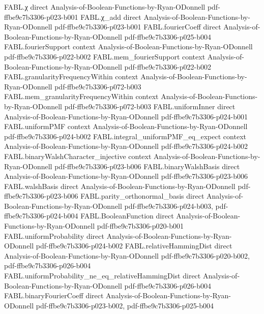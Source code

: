\begin{theorem}
\proofstep
  {FABL.χ}
  {direct}
  {Analysis-of-Boolean-Functions-by-Ryan-ODonnell}
  {pdf-ffbe9c7b3306-p023-b001}
\proofstep
  {FABL.χ_add}
  {direct}
  {Analysis-of-Boolean-Functions-by-Ryan-ODonnell}
  {pdf-ffbe9c7b3306-p023-b001}
\proofstep
  {FABL.fourierCoeff}
  {direct}
  {Analysis-of-Boolean-Functions-by-Ryan-ODonnell}
  {pdf-ffbe9c7b3306-p025-b004}
\proofstep
  {FABL.fourierSupport}
  {context}
  {Analysis-of-Boolean-Functions-by-Ryan-ODonnell}
  {pdf-ffbe9c7b3306-p022-b002}
\proofstep
  {FABL.mem_fourierSupport}
  {context}
  {Analysis-of-Boolean-Functions-by-Ryan-ODonnell}
  {pdf-ffbe9c7b3306-p022-b002}
\proofstep
  {FABL.granularityFrequencyWithin}
  {context}
  {Analysis-of-Boolean-Functions-by-Ryan-ODonnell}
  {pdf-ffbe9c7b3306-p072-b003}
\proofstep
  {FABL.mem_granularityFrequencyWithin}
  {context}
  {Analysis-of-Boolean-Functions-by-Ryan-ODonnell}
  {pdf-ffbe9c7b3306-p072-b003}
\proofstep
  {FABL.uniformInner}
  {direct}
  {Analysis-of-Boolean-Functions-by-Ryan-ODonnell}
  {pdf-ffbe9c7b3306-p024-b001}
\proofstep
  {FABL.uniformPMF}
  {context}
  {Analysis-of-Boolean-Functions-by-Ryan-ODonnell}
  {pdf-ffbe9c7b3306-p024-b002}
\proofstep
  {FABL.integral_uniformPMF_eq_expect}
  {context}
  {Analysis-of-Boolean-Functions-by-Ryan-ODonnell}
  {pdf-ffbe9c7b3306-p024-b002}
\proofstep
  {FABL.binaryWalshCharacter_injective}
  {context}
  {Analysis-of-Boolean-Functions-by-Ryan-ODonnell}
  {pdf-ffbe9c7b3306-p023-b006}
\proofstep
  {FABL.binaryWalshBasis}
  {direct}
  {Analysis-of-Boolean-Functions-by-Ryan-ODonnell}
  {pdf-ffbe9c7b3306-p023-b006}
\proofstep
  {FABL.walshBasis}
  {direct}
  {Analysis-of-Boolean-Functions-by-Ryan-ODonnell}
  {pdf-ffbe9c7b3306-p023-b006}
\proofstep
  {FABL.parity_orthonormal_basis}
  {direct}
  {Analysis-of-Boolean-Functions-by-Ryan-ODonnell}
  {pdf-ffbe9c7b3306-p024-b003,
    pdf-ffbe9c7b3306-p024-b004}
\proofstep
  {FABL.BooleanFunction}
  {direct}
  {Analysis-of-Boolean-Functions-by-Ryan-ODonnell}
  {pdf-ffbe9c7b3306-p020-b001}
\proofstep
  {FABL.uniformProbability}
  {direct}
  {Analysis-of-Boolean-Functions-by-Ryan-ODonnell}
  {pdf-ffbe9c7b3306-p024-b002}
\proofstep
  {FABL.relativeHammingDist}
  {direct}
  {Analysis-of-Boolean-Functions-by-Ryan-ODonnell}
  {pdf-ffbe9c7b3306-p020-b002,
    pdf-ffbe9c7b3306-p026-b004}
\proofstep
  {FABL.uniformProbability_ne_eq_relativeHammingDist}
  {direct}
  {Analysis-of-Boolean-Functions-by-Ryan-ODonnell}
  {pdf-ffbe9c7b3306-p026-b004}
\proofstep
  {FABL.binaryFourierCoeff}
  {direct}
  {Analysis-of-Boolean-Functions-by-Ryan-ODonnell}
  {pdf-ffbe9c7b3306-p023-b002,
    pdf-ffbe9c7b3306-p025-b004}

\end{theorem}
